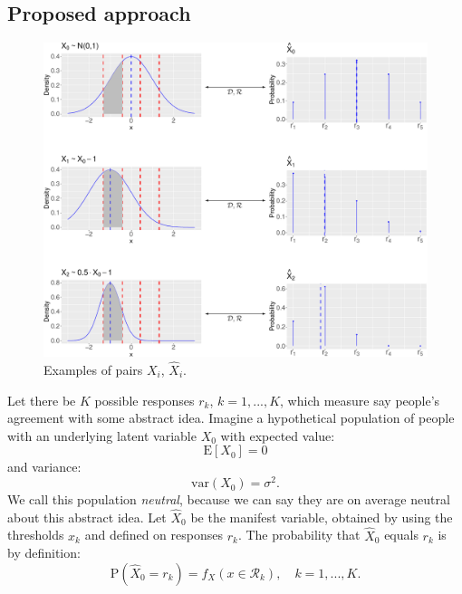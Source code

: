 \documentclass[10pt]{article}
\begin{document}
\subsection{Proposed approach}

\begin{figure}[t]
	\centering
	\includegraphics[width=\textwidth]{problem-cropped.pdf}
	\caption{ Examples of pairs $X_{i}$, $\hat{X}_{i}$.}
	\label{fig: problem-definition}
\end{figure}

Let there be $K$ possible responses $r_{k}$, $k = 1,...,K$, which measure say people's agreement with some abstract idea. Imagine a hypothetical population of people with an underlying latent variable $X_{0}$ with expected value:
\begin{equation}
\mathrm{E}[X_{0}] = 0
\end{equation}
and variance:
\begin{equation}
\mathrm{var}(X_{0}) = \sigma^{2}.
\end{equation}
We call this population {\it neutral}, because we can say they are on average neutral about this abstract idea. Let $\hat{X}_{0}$ be the manifest variable, obtained by using the thresholds $x_{k}$ and defined on responses $r_{k}$. The probability that $\hat{X}_{0}$ equals $r_{k}$ is by definition:
\begin{equation}
\mathrm{P}(\hat{X}_{0} = r_{k}) = f_{X}(x \in \mathcal{R}_{k}), \quad k = 1, ..., K.
\end{equation}
\end{document}
